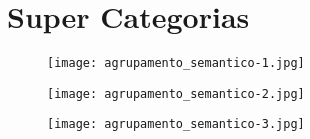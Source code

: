 \chapter{Super Categorias}
\hypertarget{super_Categorias}{}

\begin{figure}[ht]
\begin{center}
\texttt{[image: agrupamento\_semantico-1.jpg]}
\end{center}
\end{figure}


\begin{figure}[ht]
\begin{center}
\texttt{[image: agrupamento\_semantico-2.jpg]}
\end{center}
\end{figure}

    
\begin{figure}[ht]
\begin{center}
\texttt{[image: agrupamento\_semantico-3.jpg]}
\end{center}
\end{figure}
        